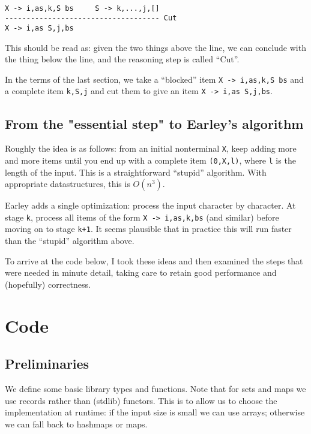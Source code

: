 \documentclass[]{article}
\begin{document}
\begin{multicols}{2}
\begin{verbatim}

X -> i,as,k,S bs     S -> k,...,j,[]
------------------------------------ Cut
X -> i,as S,j,bs

\end{verbatim}

This should be read as: given the two things above the line, we can
conclude with the thing below the line, and the reasoning step is called
``Cut''.

In the terms of the last section, we take a ``blocked'' item
\texttt{X -\textgreater{} i,as,k,S bs} and a complete item
\texttt{k,S,j} and cut them to give an item
\texttt{X -\textgreater{} i,as S,j,bs}.

\subsection{From the "essential step" to Earley's algorithm}

Roughly the idea is as follows: from an initial nonterminal \texttt{X},
keep adding more and more items until you end up with a complete item
\texttt{(0,X,l)}, where \texttt{l} is the length of the input. This is a
straightforward ``stupid'' algorithm. With appropriate datastructures,
this is \(O(n^3)\).

Earley adds a single optimization: process the input character by
character. At stage \texttt{k}, process all items of the form
\texttt{X -\textgreater{} i,as,k,bs} (and similar) before moving on to
stage \texttt{k+1}. It seems plausible that in practice this will run
faster than the ``stupid'' algorithm above.

To arrive at the code below, I took these ideas and then examined the
steps that were needed in minute detail, taking care to retain good
performance and (hopefully) correctness.

\section{Code}

\subsection{Preliminaries}

We define some basic library types and functions. Note that for sets and
maps we use records rather than (stdlib) functors. This is to allow us
to choose the implementation at runtime: if the input size is small we
can use arrays; otherwise we can fall back to hashmaps or maps.


\end{multicols}
\end{document}
